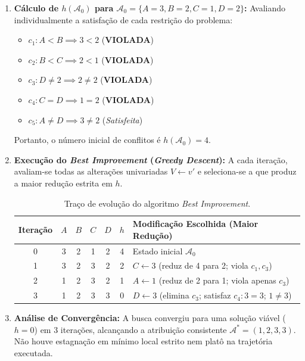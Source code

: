 \begin{enumerate}[label=(\alph*)]
    \item \textbf{Cálculo de $h(\mathcal{A}_0)$ para $\mathcal{A}_0 = \{A=3, B=2, C=1, D=2\}$:}
    Avaliando individualmente a satisfação de cada restrição do problema:
    \begin{itemize}
        \item $c_1: A < B \implies 3 < 2$ \quad (\textbf{VIOLADA})
        \item $c_2: B < C \implies 2 < 1$ \quad (\textbf{VIOLADA})
        \item $c_3: D \neq 2 \implies 2 \neq 2$ \quad (\textbf{VIOLADA})
        \item $c_4: C = D \implies 1 = 2$ \quad (\textbf{VIOLADA})
        \item $c_5: A \neq D \implies 3 \neq 2$ \quad (\textit{Satisfeita})
    \end{itemize}
    Portanto, o número inicial de conflitos é $h(\mathcal{A}_0) = 4$.

    \item \textbf{Execução do \textit{Best Improvement} (\textit{Greedy Descent}):}
    A cada iteração, avaliam-se todas as alterações univariadas $V \leftarrow v'$ e seleciona-se a que produz a maior redução estrita em $h$.

    \begin{table}[H]
    \centering
    \caption{Traço de evolução do algoritmo \textit{Best Improvement}.}
    \label{tab:best_improvement}
    \begin{tabular}{@{}ccccccl@{}}
    \toprule
    \textbf{Iteração} & $A$ & $B$ & $C$ & $D$ & $h$ & \textbf{Modificação Escolhida (Maior Redução)} \\ \midrule
    0 & 3 & 2 & 1 & 2 & 4 & Estado inicial $\mathcal{A}_0$ \\
    1 & 3 & 2 & 3 & 2 & 2 & $C \leftarrow 3$ (reduz de 4 para 2; viola $c_1, c_3$) \\
    2 & 1 & 2 & 3 & 2 & 1 & $A \leftarrow 1$ (reduz de 2 para 1; viola apenas $c_3$) \\
    3 & 1 & 2 & 3 & 3 & 0 & $D \leftarrow 3$ (elimina $c_3$; satisfaz $c_4: 3=3$; $1 \neq 3$) \\ \bottomrule
    \end{tabular}
    \end{table}

    \item \textbf{Análise de Convergência:}
    A busca convergiu para uma solução viável ($h = 0$) em 3 iterações, alcançando a atribuição consistente $\mathcal{A}^* = (1, 2, 3, 3)$. Não houve estagnação em mínimo local estrito nem platô na trajetória executada.


\end{enumerate}
